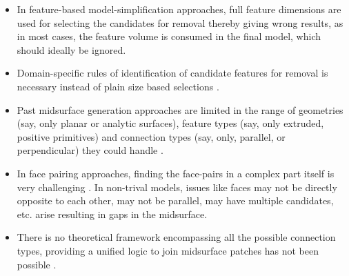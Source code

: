 \begin{itemize}[noitemsep,topsep=2pt,parsep=2pt,partopsep=2pt]%

	\item  In feature-based model-simplification approaches, full feature dimensions are used for selecting the candidates for removal \cite{Russ2012} thereby giving wrong results, as in most cases, the feature volume is consumed in the final model, which should ideally be ignored.
	\item Domain-specific rules of identification of candidate features for removal is necessary instead of plain size based selections \cite{AdskElectronicsHelp}.
	\item Past midsurface generation approaches are limited in the range of geometries (say, only planar or analytic surfaces), feature types (say, only extruded, positive primitives) and connection types (say, only, parallel, or perpendicular) they could handle \cite{Woo2013}. 
	\item  %
In face pairing approaches, finding the face-pairs in a complex part itself is very challenging \cite{Boussuge2013}. In non-trival models, issues like faces may not be directly opposite to each other, may not be parallel, may have multiple candidates, etc. arise resulting in gaps in the midsurface. %
	\item  %
There is no theoretical framework encompassing all the possible connection types, providing a unified logic to join midsurface patches has not been possible \cite{Stolt2006}. %
\end{itemize}
 
 
 
